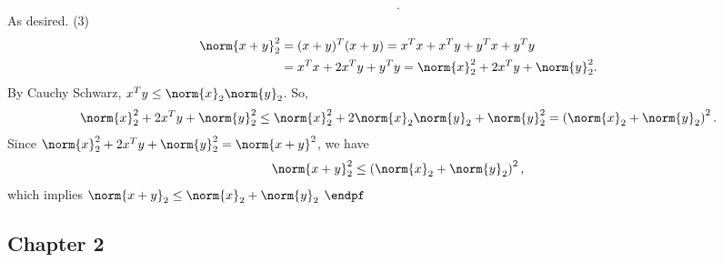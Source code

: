 \documentclass{report}
\begin{document}
\begin{itemize}
\begin{align*}
            .\end{align*}
            As desired.
            \bigbreak \noindent 
            (3)
            \begin{align*}
                \norm{x + y}^{2}_{2} &= (x+y)^{T}(x+y) = x^{T}x + x^{T}y + y^{T}x + y^{T}y \\
                                 &= x^{T}x + 2x^{T}y + y^{T}y = \norm{x}_{2}^{2} + 2x^{T}y + \norm{y}_{2}^{2}
            .\end{align*}
            By Cauchy Schwarz, $x^{T}y \leq \norm{x}_{2}\norm{y}_{2}$. So,
            \begin{align*}
                \norm{x}_{2}^{2} + 2x^{T}y + \norm{y}_{2}^{2} \leq \norm{x}_{2}^{2} + 2\norm{x}_{2}\norm{y}_{2} + \norm{y}_{2}^{2} = \left(\norm{x}_{2} + \norm{y}_{2}\right)^{2}
            .\end{align*}
            Since $\norm{x}_{2}^{2} + 2x^{T}y + \norm{y}_{2}^{2} = \norm{x+y}^{2}$, we have
            \begin{align*}
                \norm{x+y}_{2}^{2} \leq \left(\norm{x}_{2} + \norm{y}_{2}\right)^{2},
            \end{align*}
            which implies $\norm{x+y}_{2} \leq \norm{x}_{2} + \norm{y}_{2}$ $\endpf$



    \end{itemize}


    \pagebreak 
    \subsection{Chapter 2}
    \bigbreak \noindent 
\end{document}
